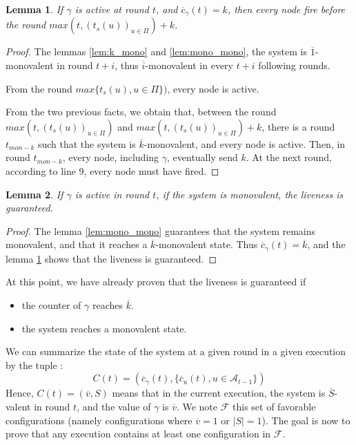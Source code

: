 \documentclass{article}
\newtheorem{lemma}{Lemma}[section]
\newcommand{\cent}{\gamma}
\begin{document}
\begin{lemma}\label{lem:k_liv}
	If $\cent$ is active at round $t$, and $\overline{c}_\cent(t) = k$, then every node fire before the round $max(t, (t_s(u))_{u \in \Pi})+k$.
\end{lemma}
\begin{proof}
	The lemmas \ref{lem:k_mono} and \ref{lem:mono_mono}, the system is $\overline{1}$-monovalent in round $t+i$,
	thus $\overline{i}$-monovalent in every $t+i$ following rounds.

	From the round $max \{t_s(u), u \in \Pi\})$, every node is active.

	From the two previous facts, we obtain that, between the round $max(t, (t_s(u))_{u \in \Pi})$ and $max(t, (t_s(u))_{u \in \Pi})+k$, there is a round $t_{mon-k}$
	such that the system is $\overline{k}$-monovalent, and every node is active.
	Then, in round $t_{mon-k}$, every node, including $\cent$, eventually send $k$.
	At the next round, according to line 9, every node must have fired.
\end{proof}
 
\begin{lemma}\label{lem:mono_liv}
	If $\cent$ is active in round $t$, if the system is monovalent, the liveness is guaranteed.
\end{lemma}
\begin{proof}
	The lemma \ref{lem:mono_mono} guarantees that the system remains monovalent, and that it reaches a
	$\overline{k}$-monovalent state.
	Thus $\overline{c}_\cent(t) = \overline{k}$, and the lemma \ref{lem:k_liv} shows that the liveness is guaranteed.
\end{proof}

\noindent At this point, we have already proven that the liveness is guaranteed if
\begin{itemize}
	\item the counter of $\cent$ reaches $\overline{k}$.
	\item the system reaches a monovalent state.
\end{itemize}

\noindent We can summarize the state of the system at a given round in a given execution by the tuple : 
$$C(t) = (\overline{c}_\cent(t), \{\overline{c}_u(t), u \in \mathcal{A}_{t-1}\})$$
Hence, $C(t) = (\overline{v}, S)$ means that in the current execution, the system is $\overline{S}$-valent in round $t$, and the value of $\cent$ is $\overline{v}$.
We note $\mathcal{F}$ this set of favorable configurations (namely configurations where $\overline{v} = 1$ or $| S | = 1$).
The goal is now to prove that any execution contains at least one configuration in $\mathcal{F}$.
\end{document}
